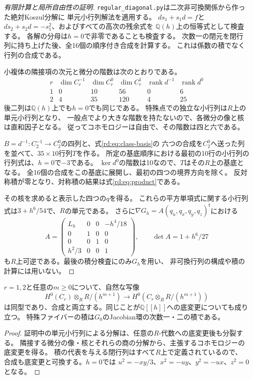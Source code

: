 \begin{proof}[有限計算と局所自由性の証明]
\texttt{regular\_diagonal.py}は二次非可換関係から作った絶対Koszul分解に
単元小行列解法を適用する。
$d s_1+s_1d=f$と$d s_2+s_2d=-s_1^2$、およびすべての高次の残余式を
$\mathbb Q(h)$上の恒等式として検査する。
各解の分母は$h=0$で非零であることも検査する。
次数一の閉元を閉行列に持ち上げた後、全16個の順序付き合成を計算する。
これは係数の積でなく行列の合成である。

小複体の隣接項の次元と微分の階数は次のとおりである。
\[
\begin{array}{c|ccc|cc}
 r&\dim C_r^{-1}&\dim C_r^0&\dim C_r^1&
 \operatorname{rank}d^{-1}&\operatorname{rank}d^0\\\hline
 1&0&10&56&0&6\\
 2&4&35&120&4&25
\end{array}
\]
後二列は$\mathbb Q(h)$上でも$h=0$でも同じである。
特殊点での独立な小行列は$R$上の単元小行列となり、
一般点でより大きな階数を持たないので、各微分の像と核は直和因子となる。
従ってコホモロジーは自由で、その階数は四と六である。

$B=d^{-1}:C_2^{-1}\to C_2^0$の四列と、式\eqref{rd:eq:class-basis}の
六つの合成を$C_2^0$へ送った列を並べて、$35\times10$行列$T$を作る。
所定の基底順序における最初の10行の小行列の行列式は、$h=0$で$-3$である。
$\ker d^0$の階数は10なので、$T$はその$R$上の基底となる。
全16個の合成をこの基底に展開し、最初の四つの境界方向を除く。
反対称積が零となり、対称積の結果は式\eqref{rd:eq:product}である。

その核を求めると表示した四つの$q$を得る。
これらの平方単項式に関する小行列式は$3+h^6/54$で、$R$の単元である。
さらに$\nabla G_h=A(q_u,q_x,q_y,q_z)^{\mathsf t}$における
\[
 A=\begin{pmatrix}
 L_h&0&0&-h^4/18\\
 0&1&0&0\\0&0&1&0\\h^2/3&0&0&1
 \end{pmatrix},\qquad \det A=1+h^6/27
\]
も$R$上可逆である。最後の積分検査にのみ$G_h$を用い、
非可換行列の構成や積の計算には用いない。
\end{proof}

\begin{corollary}[全Artin切断と完備化]\label{rd:cor:basechange}
$r=1,2$と任意の$m\ge0$について、自然な写像
\[
 H^0(C_r)\otimes_R R/(h^{m+1})
 \longrightarrow H^0(C_r\otimes_R R/(h^{m+1}))
\]
は同型であり、合成と両立する。同じことが$\mathbb Q[[h]]$への底変更についても成り立つ。
特殊ファイバーの積は$G_0$のJacobian環の次数一・二の積である。
\end{corollary}
\begin{proof}
証明中の単元小行列による分解は、任意の$R$-代数への底変更後も分裂する。
隣接する微分の像・核とそれらの商の分解から、主張するコホモロジーの底変更を得る。
積の代表を与える閉行列はすべて$R$上で定義されているので、
合成も底変更と可換する。$h=0$では
$u^2=-xy/3$、$x^2=-uy$、$y^2=-ux$、$z^2=0$となる。
\end{proof}

